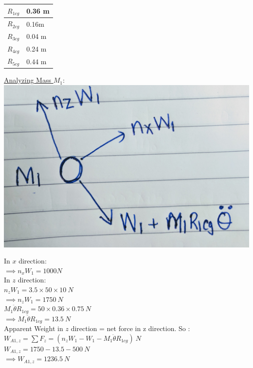 \documentclass{article}
\begin{document}
\begin{tabular}{ | m{1cm} | m{1cm}|} 
\hline
$R_{1cg}$ & 0.36 m  \\ 
\hline
$R_{2cg}$ & 0.16m  \\  
\hline
$R_{3cg}$ & 0.04 m \\ 
\hline
$R_{4cg}$ & 0.24 m  \\ 
\hline
$R_{5cg}$ & 0.44 m\\
\hline
\end{tabular}
\bigbreak

\noindent \underline{Analyzing Mass $M_1$}:\\

\includegraphics[scale=0.05]{m1.jpg}


\noindent In $x$ direction:\\

$\implies n_xW_1= 1000 N $\\

\noindent In $z$ direction: \\

\noindent $n_zW_1= 3.5 \times 50 \times 10\ N$\\
$\implies n_zW_1 = 1750\ N$\\

\noindent $M_1\ddot{\theta}R_{1cg}=50 \times 0.36 \times 0.75\ N $\\
$\implies M_1\ddot{\theta}R_{1cg}= 13.5\ N $\\

\noindent Apparent Weight in $z$ direction = net force in z direction. So : \\
$W_{A1,z}=\sum F_z = (n_zW_1-W_1- M_1\ddot{\theta}R_{1cg})\ N$\\
$W_{A1,z}= 1750- 13.5- 500\ N$\\
$\implies W_{A1,z}= 1236.5\ N$\\
\end{document}
